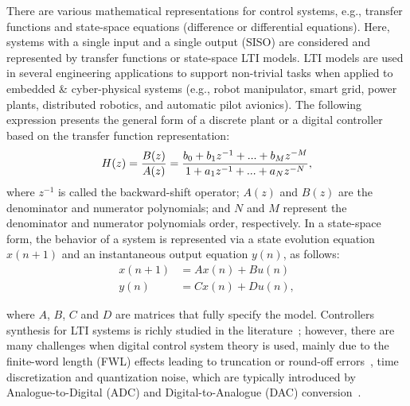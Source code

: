 \documentclass[10pt,conference]{IEEEtran}
\begin{document}


There are various mathematical representations for control 
systems,  e.g.,  transfer functions and state-space equations (difference or differential equations). 
Here, 
systems with a single input and a single output (SISO) are considered and 
represented by transfer functions or state-space LTI models. LTI models 
are used in several engineering applications to support non-trivial tasks when 
applied to embedded \& cyber-physical systems (e.g., robot manipulator, smart grid, 
power plants, distributed robotics, and automatic pilot avionics). 
The following expression presents the general form 
of a discrete plant or a digital controller based on the transfer function representation:
%
\begin{equation}
\small
\label{eq:transferfunction}
H(z)=\frac{B(z)}{A(z)}=\frac{b_{0}+b_{1}z^{-1}+...+b_{M}z^{-M}}{1+a_{1}z^{-1}+...+a_{N}z^{-N}},
\end{equation}
%
\noindent where $z^{-1}$ is called the backward-shift operator; $A(z)$ and $B(z)$ are 
the denominator and numerator polynomials; and $N$ and $M$
represent the denominator and numerator polynomials order, respectively.
%
In a state-space form, 
the behavior of a system is represented via a state evolution equation $x(n+1)$ and an instantaneous 
output equation $y(n)$, as follows:
%
\begin{equation}
\begin{split}
x(n+1) &= A x(n) + B u(n)
\\
y(n) &= C x(n) + D u(n), 
\end{split}\label{eq:ss-example}
\end{equation}

\noindent where $A$, $B$, $C$ and $D$ are matrices that fully specify the model. 
%
Controllers synthesis for LTI systems is richly studied 
in the literature~\cite{mazo2010pessoa,DBLP:conf/emsoft/RavanbakhshS16,economakos2016automated}; 
however, there are many challenges when 
digital control system theory is used, mainly due to the finite-word 
length (FWL) effects leading to truncation 
or round-off errors~\cite{Guang2013, Istepanian2001}, time discretization 
and quantization noise, which are typically introduced by Analogue-to-Digital 
(ADC) and Digital-to-Analogue (DAC) conversion~\cite{astrom1997computer}. 
\end{document}

